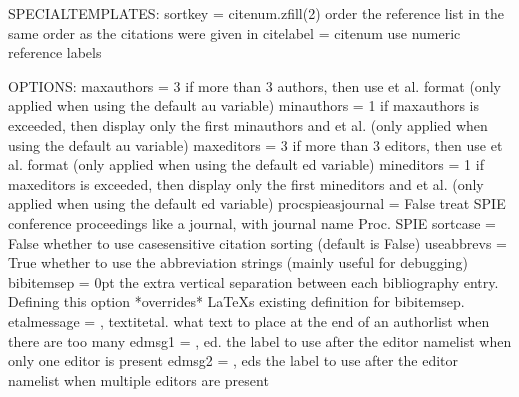 \documentclass[letterpaper,10pt,english]{sphinxmanual}
\begin{document}
\begin{sphinxVerbatim}[commandchars=\\\{\}]
SPECIAL\PYGZhy{}TEMPLATES:
sortkey = \PYGZlt{}citenum.zfill(2)\PYGZgt{}              \PYGZsh{}\PYGZsh{} order the reference list in the same order as the citations were given in
citelabel = \PYGZlt{}citenum\PYGZgt{}                     \PYGZsh{}\PYGZsh{} use numeric reference labels

OPTIONS:
maxauthors = 3                            \PYGZsh{}\PYGZsh{} if more than 3 authors, then use \PYGZdq{}et al.\PYGZdq{} format (only applied when using the default \PYGZdq{}\PYGZlt{}au\PYGZgt{}\PYGZdq{} variable)
minauthors = 1                            \PYGZsh{}\PYGZsh{} if \PYGZdq{}maxauthors\PYGZdq{} is exceeded, then display only the first \PYGZdq{}minauthors\PYGZdq{} and et al. (only applied when using the default \PYGZdq{}\PYGZlt{}au\PYGZgt{}\PYGZdq{} variable)
maxeditors = 3                            \PYGZsh{}\PYGZsh{} if more than 3 editors, then use \PYGZdq{}et al.\PYGZdq{} format (only applied when using the default \PYGZdq{}\PYGZlt{}ed\PYGZgt{}\PYGZdq{} variable)
mineditors = 1                            \PYGZsh{}\PYGZsh{} if \PYGZdq{}maxeditors\PYGZdq{} is exceeded, then display only the first \PYGZdq{}mineditors\PYGZdq{} and et al. (only applied when using the default \PYGZdq{}\PYGZlt{}ed\PYGZgt{}\PYGZdq{} variable)
procspie\PYGZus{}as\PYGZus{}journal = False               \PYGZsh{}\PYGZsh{} treat SPIE conference proceedings like a journal, with journal name \PYGZsq{}Proc. SPIE\PYGZsq{}
sort\PYGZus{}case = False                         \PYGZsh{}\PYGZsh{} whether to use case\PYGZhy{}sensitive citation sorting (default is False)
use\PYGZus{}abbrevs = True                        \PYGZsh{}\PYGZsh{} whether to use the abbreviation strings (mainly useful for debugging)
bibitemsep = 0pt                          \PYGZsh{}\PYGZsh{} the extra vertical separation between each bibliography entry. Defining this option *overrides* LaTeX\PYGZsq{}s existing definition for \PYGZbs{}bibitemsep.
etal\PYGZus{}message = , \PYGZbs{}textit\PYGZob{}et\PYGZti{}al.\PYGZcb{}          \PYGZsh{}\PYGZsh{} what text to place at the end of an authorlist when there are too many
edmsg1 = , ed.                            \PYGZsh{}\PYGZsh{} the label to use after the editor namelist when only one editor is present
edmsg2 = , eds                            \PYGZsh{}\PYGZsh{} the label to use after the editor namelist when multiple editors are present


\end{sphinxVerbatim}
\end{document}
